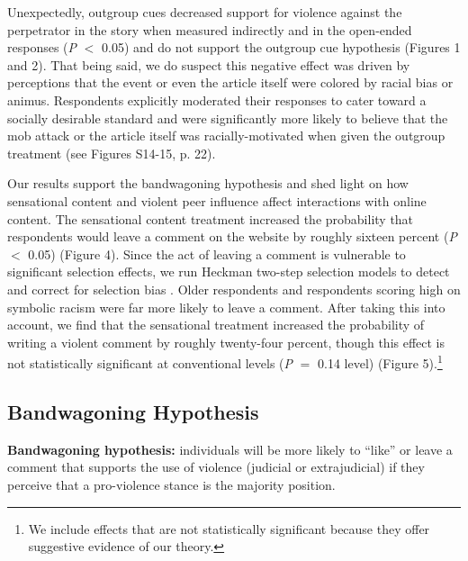 Unexpectedly, outgroup cues decreased support for violence against the perpetrator in the story when measured indirectly and in the open-ended responses (\textit{P} $<$ 0.05) and do not support the outgroup cue hypothesis (Figures 1 and 2). That being said, we do suspect this negative effect was driven by perceptions that the event or even the article itself were colored by racial bias or animus. Respondents explicitly moderated their responses to cater toward a socially desirable standard and were significantly more likely to believe that the mob attack or the article itself was racially-motivated when given the outgroup treatment (see Figures S14-15, p. 22).

Our results support the bandwagoning hypothesis and shed light on how sensational content and violent peer influence affect interactions with online content. The sensational content treatment increased the probability that respondents would leave a comment on the website by roughly sixteen percent (\textit{P} $<$ 0.05) (Figure 4). Since the act of leaving a comment is vulnerable to significant selection effects, we run Heckman two-step selection models to detect and correct for selection bias \citep{heckman1979sample}. Older respondents and respondents scoring high on symbolic racism were far more likely to leave a comment. After taking this into account, we find that the sensational treatment increased the probability of writing a violent comment by roughly twenty-four percent, though this effect is not statistically significant at conventional levels (\textit{P} $=$ 0.14 level) (Figure 5).\footnote{We include effects that are not statistically significant because they offer suggestive evidence of our theory.}

\subsection{Bandwagoning Hypothesis}

\vspace{1em}
\noindent\textbf{Bandwagoning hypothesis:} individuals will be more likely to ``like'' or leave a comment that supports the use of violence (judicial or extrajudicial) if they perceive that a pro-violence stance is the majority position.
\vspace{1em}

